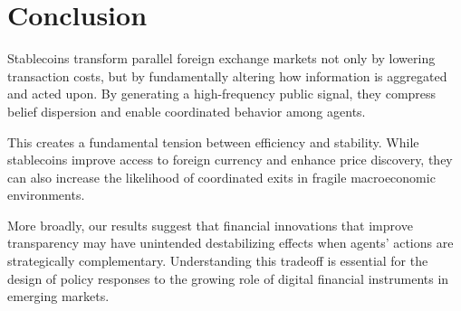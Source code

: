 \section{Conclusion}

Stablecoins transform parallel foreign exchange markets not only by lowering transaction costs, but by fundamentally altering how information is aggregated and acted upon. By generating a high-frequency public signal, they compress belief dispersion and enable coordinated behavior among agents.

This creates a fundamental tension between efficiency and stability. While stablecoins improve access to foreign currency and enhance price discovery, they can also increase the likelihood of coordinated exits in fragile macroeconomic environments. 

More broadly, our results suggest that financial innovations that improve transparency may have unintended destabilizing effects when agents’ actions are strategically complementary. Understanding this tradeoff is essential for the design of policy responses to the growing role of digital financial instruments in emerging markets.